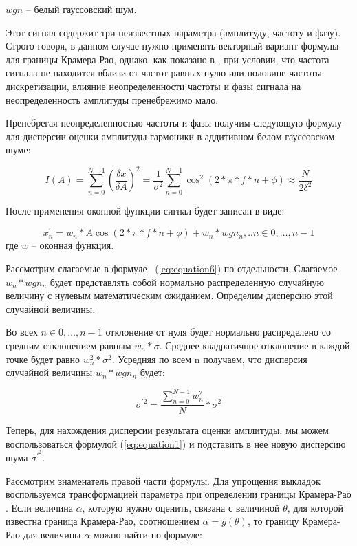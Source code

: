$wgn$ -- белый гауссовский шум.

Этот сигнал содержит три неизвестных параметра (амплитуду, частоту и фазу). Строго говоря, в данном случае нужно применять векторный вариант формулы для границы Крамера-Рао, однако, как показано в \cite{kay1993fundamentals}, при условии, что частота сигнала не находится вблизи от частот равных нулю или половине частоты дискретизации, влияние неопределенности частоты и фазы сигнала на неопределенность амплитуды пренебрежимо мало.

Пренебрегая неопределенностью частоты и фазы получим следующую формулу для дисперсии оценки амплитуды гармоники в аддитивном белом гауссовском шуме: 

\begin{equation}
	\label{eq:equation5}
	I(A)=\sum_{n=0}^{N-1}\left( \frac{\delta x}{\delta A} \right)^2 =\frac{1}{\sigma^2} \sum_{n=0}^{N-1}\cos^2 (2*\pi*f*n+\phi)\approx \frac{N}{2\delta ^2 }
\end{equation}

После применения оконной функции сигнал будет записан в виде: 

\begin{equation}
	\label{eq:equation6}
	x_n^{'}= w_n*A\cos(2*\pi*f*n+\phi)+w_n*wgn_n,..n\in 0,…,n-1
\end{equation}
где $w$ -- оконная функция.

Рассмотрим слагаемые в формуле ~(\ref{eq:equation6}) по отдельности. Слагаемое $w_n*wgn_n$ будет представлять собой нормально распределенную случайную величину с нулевым математическим ожиданием. Определим дисперсию этой случайной величины.

Во всех $n\in 0,…,n-1$ отклонение от нуля будет нормально распределено со средним отклонением равным $w_n*\sigma$. Среднее квадратичное отклонение в каждой точке будет равно $w_n^2*\sigma^2$. Усредняя по всем n получаем, что дисперсия случайной величины $w_n*wgn_n$ будет: 

\begin{equation}
	\label{eq:equation7}
	\sigma^{'2}=\frac{\sum_{n=0}^{N-1} w_n^2}{N}*\sigma^2
\end{equation}

Теперь, для нахождения дисперсии результата оценки амплитуды, мы можем воспользоваться формулой (\ref{eq:equation1}) и подставить в нее новую дисперсию шума $\sigma^{'^2}$.

Рассмотрим знаменатель правой части формулы. Для упрощения выкладок воспользуемся трансформацией параметра при определении границы Крамера-Рао \cite{kay1993fundamentals,kay2013fundamentals}. Если величина $\alpha$, которую нужно оценить, связана с величиной $\theta$, для которой известна граница Крамера-Рао, соотношением $\alpha=g(\theta)$, то границу Крамера-Рао для величины $\alpha$ можно найти по формуле: 

